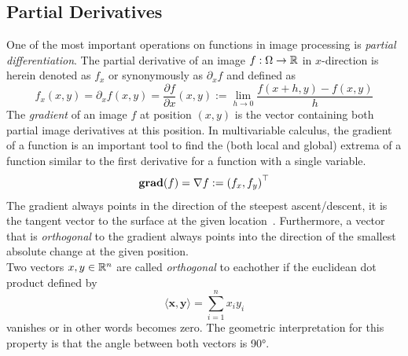 \subsection{Partial Derivatives}
One of the most important operations on functions in image processing is \textit{partial
    differentiation}.
The partial derivative of an image $f: \Omega \rightarrow \mathbb{R}$ in $x$-direction is herein denoted as $f_x$ or
synonymously as $\partial_x f$ and defined as
\begin{equation}
    f_x(x, y) = \partial_x f (x, y) = \frac{\partial f}{\partial x} (x, y) := \lim_{h \to 0}\frac{f(x+h, y) -f(x, y)}{h} 
\end{equation}
The \textit{gradient} of an image $f$ at position $(x, y)$ is the vector containing both partial
image derivatives at this position.
In multivariable calculus, the gradient of a function is an important tool to find the (both local
and global) extrema of a function similar to the first derivative for a function with a single
variable.
\begin{equation}
    \textbf{grad}(f) = \mathbf{\nabla} f := {\left(f_x, f_y\right)}^\top\label{def:Grad}
\end{equation}
The gradient always points in the direction of the steepest ascent/descent, it is the tangent
vector to the surface at the given location~\cite{mfi3}. Furthermore, a vector that is
\textit{orthogonal} to the gradient always points into the direction of the smallest absolute
change at the given position.\\
Two vectors $x,y\in\mathbb{R}^n$ are called \textit{orthogonal} to eachother if the euclidean dot product defined by 
\begin{equation}
    \langle\mathbf{x}, \mathbf{y}\rangle = \sum_{i=1}^n x_{i}y_i
\end{equation}
vanishes or in other words becomes zero.
The geometric interpretation for this property is that the angle between both vectors is 90°.

